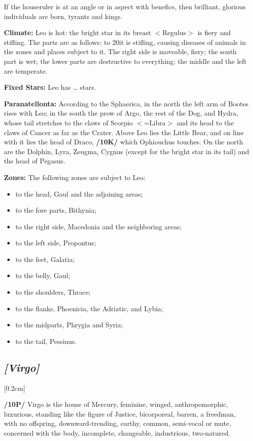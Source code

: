 \mndl[0.2cm]
If the houseruler is at an angle or in aspect with benefics, then brilliant, glorious individuals are born, tyrants and kings.

\textbf{Climate:} Leo is hot: the bright star in its breast $<$Regulus$>$ is fiery and stifling. The parts are as follows: to 20\deg it is stifling, causing diseases of animals in the zones and places subject to it. The right side is moveable,
fiery; the south part is wet; the lower parts are destructive to everything; the middle and the left are temperate.

\textbf{Fixed Stars:} Leo has … stars. 

\textbf{Paranatellonta:} According to the Sphaerica, in the north the left arm of Bootes rises with Leo; in the south the prow of Argo, the rest of the Dog, and Hydra, whose tail stretches to the claws of Scorpio $<$=Libra$>$ and its head to the claws of Cancer as far as the Crater. Above Leo lies the Little Bear, and on line with it lies the head of Draco, \textbf{/10K/} which Ophiouchus touches. On the north are the Dolphin, Lyra, Zeugma, Cygnus (except for the bright star in its tail) and the head of Pegasus.

\textbf{Zones: } The following zones are subject to Leo: 
\begin{itemize}
\item to the head, Gaul and the adjoining areas; 
\item to the fore parts, Bithynia; 
\item to the right side, Macedonia and the neighboring areas; \item to the left side, Propontus; 
\item to the feet, Galatia; 
\item to the belly, Gaul; 
\item to the shoulders, Thrace; 
\item to the flanks, Phoenicia, the Adriatic, and Lybia; 
\item to the midparts, Phrygia and Syria; 
\item to the tail, Pessinus.
\end{itemize}

\secbr
\subsection{\textit{[Virgo]}}
[0.2cm]

\textbf{/10P/} Virgo is the house of Mercury, feminine, winged, anthropomorphic, luxurious, standing like the
figure of Justice, bicorporeal, barren, a freedman, with no offspring, downward-trending, earthy, common, semi-vocal or mute, concerned with the body, incomplete, changeable, industrious, two-natured. 

